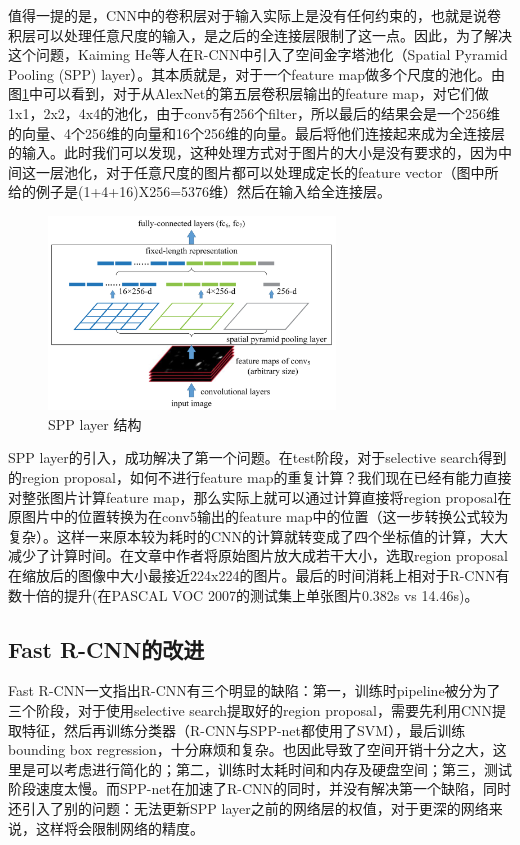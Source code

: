 \documentclass[10pt,twocolumn,letterpaper]{article}
\begin{document}
值得一提的是，CNN中的卷积层对于输入实际上是没有任何约束的，也就是说卷积层可以处理任意尺度的输入，是之后的全连接层限制了这一点。因此，为了解决这个问题，Kaiming He等人在R-CNN中引入了空间金字塔池化（Spatial Pyramid Pooling (SPP) layer）。其本质就是，对于一个feature map做多个尺度的池化。由图\ref{figure:sppnet}中可以看到，对于从AlexNet的第五层卷积层输出的feature map，对它们做1x1，2x2，4x4的池化，由于conv5有256个filter，所以最后的结果会是一个256维的向量、4个256维的向量和16个256维的向量。最后将他们连接起来成为全连接层的输入。此时我们可以发现，这种处理方式对于图片的大小是没有要求的，因为中间这一层池化，对于任意尺度的图片都可以处理成定长的feature vector（图中所给的例子是(1+4+16)X256=5376维）然后在输入给全连接层。
\begin{figure}[htbp] %
   \centering
   \includegraphics[width=3in]{sppnet.png} 
   \caption{SPP layer 结构}
   \label{figure:sppnet}
\end{figure}

SPP layer的引入，成功解决了第一个问题。在test阶段，对于selective search得到的region proposal，如何不进行feature map的重复计算？我们现在已经有能力直接对整张图片计算feature map，那么实际上就可以通过计算直接将region proposal在原图片中的位置转换为在conv5输出的feature map中的位置（这一步转换公式较为复杂）。这样一来原本较为耗时的CNN的计算就转变成了四个坐标值的计算，大大减少了计算时间。在文章中作者将原始图片放大成若干大小，选取region proposal在缩放后的图像中大小最接近224x224的图片。最后的时间消耗上相对于R-CNN有数十倍的提升(在PASCAL VOC 2007的测试集上单张图片0.382s vs 14.46s)。

\subsection{Fast R-CNN的改进}

Fast R-CNN一文指出R-CNN有三个明显的缺陷：第一，训练时pipeline被分为了三个阶段，对于使用selective search提取好的region proposal，需要先利用CNN提取特征，然后再训练分类器（R-CNN与SPP-net都使用了SVM），最后训练bounding box regression，十分麻烦和复杂。也因此导致了空间开销十分之大，这里是可以考虑进行简化的；第二，训练时太耗时间和内存及硬盘空间；第三，测试阶段速度太慢。而SPP-net在加速了R-CNN的同时，并没有解决第一个缺陷，同时还引入了别的问题：无法更新SPP layer之前的网络层的权值，对于更深的网络来说，这样将会限制网络的精度。
\end{document}
